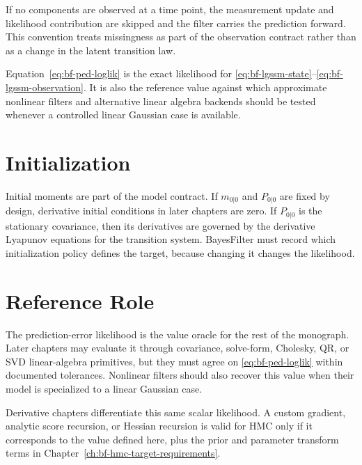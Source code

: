 If no components are observed at a time point, the measurement update and
likelihood contribution are skipped and the filter carries the prediction
forward.  This convention treats missingness as part of the observation
contract rather than as a change in the latent transition law.

Equation~\eqref{eq:bf-ped-loglik} is the exact likelihood for
\eqref{eq:bf-lgssm-state}--\eqref{eq:bf-lgssm-observation}.  It is also the
reference value against which approximate nonlinear filters and alternative
linear algebra backends should be tested whenever a controlled linear Gaussian
case is available.

\section{Initialization}
\label{sec:bf-kalman-initialization}

Initial moments are part of the model contract.  If $m_{0|0}$ and $P_{0|0}$ are
fixed by design, derivative initial conditions in later chapters are zero.  If
$P_{0|0}$ is the stationary covariance, then its derivatives are governed by
the derivative Lyapunov equations for the transition system.  BayesFilter must
record which initialization policy defines the target, because changing it
changes the likelihood.

\section{Reference Role}
\label{sec:bf-ped-reference-role}

The prediction-error likelihood is the value oracle for the rest of the
monograph.  Later chapters may evaluate it through covariance, solve-form,
Cholesky, QR, or SVD linear-algebra primitives, but they must agree on
\eqref{eq:bf-ped-loglik} within documented tolerances.  Nonlinear filters
should also recover this value when their model is specialized to a linear
Gaussian case.

Derivative chapters differentiate this same scalar likelihood.  A custom
gradient, analytic score recursion, or Hessian recursion is valid for HMC only
if it corresponds to the value defined here, plus the prior and parameter
transform terms in Chapter~\ref{ch:bf-hmc-target-requirements}.
